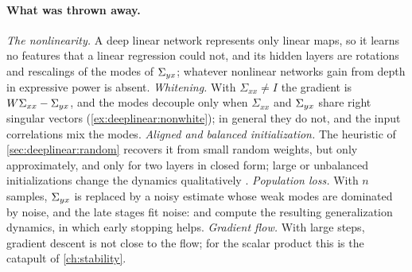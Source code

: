 \begin{refsection}
\paragraph{What was thrown away.} \emph{The nonlinearity.} A deep linear network represents only linear maps, so it learns no features that a linear regression could not, and its hidden layers are rotations and rescalings of the modes of $\Sigma_{yx}$; whatever nonlinear networks gain from depth in expressive power is absent. \emph{Whitening.} With $\Sigma_{xx}\ne I$ the gradient is $W\Sigma_{xx}-\Sigma_{yx}$, and the modes decouple only when $\Sigma_{xx}$ and $\Sigma_{yx}$ share right singular vectors (\cref{ex:deeplinear:nonwhite}); in general they do not, and the input correlations mix the modes. \emph{Aligned and balanced initialization.} The heuristic of \cref{sec:deeplinear:random} recovers it from small random weights, but only approximately, and only for two layers in closed form; large or unbalanced initializations change the dynamics qualitatively \parencite{KuninEtAl2024}. \emph{Population loss.} With $n$ samples, $\Sigma_{yx}$ is replaced by a noisy estimate whose weak modes are dominated by noise, and the late stages fit noise: \textcite{AdvaniEtAl2020} and \textcite{LampinenGanguli2019} compute the resulting generalization dynamics, in which early stopping helps. \emph{Gradient flow.} With large steps, gradient descent is not close to the flow; for the scalar product this is the catapult of \cref{ch:stability}.


\end{refsection}
